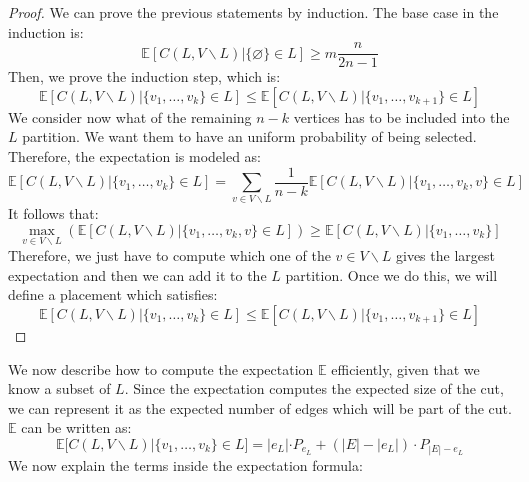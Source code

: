 \documentclass[11pt,a4paper]{article}
\begin{document}
\begin{proof}
We can prove the previous statements by induction.
\smallskip
The base case in the induction is:
\begin{equation}
\mathbb{E}[C(L,V\backslash L) | \{\varnothing\} \in L ] \geq m\frac{n}{2n-1}
\end{equation}
Then, we prove the induction step, which is:
\begin{equation}
\mathbb{E}[C(L,V\backslash L)| \{v_1, \ldots, v_k\} \in L] \leq \mathbb{E}[C(L,V\backslash L)| \{v_1, \ldots, v_{k+1}\} \in L]
\end{equation}
We consider now what of the remaining $n-k$ vertices has to be included into the $L$ partition. We want them
to have an uniform probability of being selected. Therefore, the expectation is modeled as:
\begin{equation}
\mathbb{E}[C(L,V\backslash L)| \{v_1, \ldots, v_k\} \in L] = \sum_{v \in V\backslash L} \frac{1}{n-k}\mathbb{E}[C(L,V\backslash L)| \{v_1, \ldots, v_{k}, v\} \in L]
\end{equation}
It follows that:
\begin{equation}
\max_{v \in V\backslash L}(\mathbb{E}[C(L,V\backslash L)| \{v_1, \ldots, v_k, v\} \in L]) \geq \mathbb{E}[C(L,V\backslash L)| \{v_1, \ldots, v_k\}]
\end{equation}
Therefore, we just have to compute which one of the $v \in V\backslash L$ gives the largest expectation and then
we can add it to the $L$ partition. Once we do this, we will define a placement which satisfies:
\begin{equation}
\mathbb{E}[C(L,V\backslash L)| \{v_1, \ldots, v_k\} \in L] \leq \mathbb{E}[C(L,V\backslash L)| \{v_1, \ldots, v_{k+1}\} \in L]
\end{equation}
\end{proof}
We now describe how to compute the expectation $\mathbb{E}$ efficiently, given that we know a subset of $L$. 
Since the expectation computes the expected size of the cut, we can represent it as the expected number of edges
which will be part of the cut. $\mathbb{E}$ can be written as:
\begin{equation}
\mathbb{E}[C(L,V\backslash L)| \{v_1, \ldots, v_k\} \in L] = |e_L|\cdot P_{e_L} + (|E|-|e_L|)\cdot P_{|E|-e_L}
\end{equation}
We now explain the terms inside the expectation formula:
\end{document}

